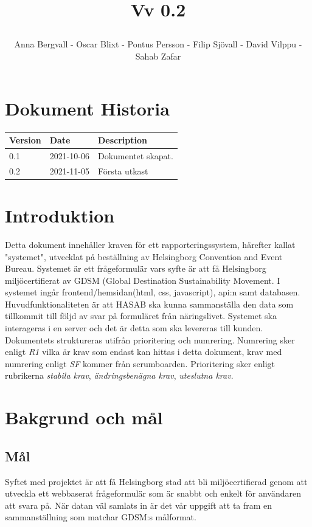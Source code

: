 \documentclass{article}
\date {#1}
\title {
    \documentNumber {01}    

    \documentTitle {Helsingborg Event and Convention Bureau}
    
    \documentDate {2021-08-20}
    \documentVersion Vv 0.2
    
    \author{Anna Bergvall - Oscar Blixt - Pontus Persson - Filip Sjövall - David Vilppu - Sahab Zafar}
}
\begin{document}
\maketitle

\thispagestyle{empty}



\newpage

\tableofcontents


\newpage

\section{Dokument Historia}
\begin{tabular}{ l | l | l }
    Version & Date & Description \\
    \hline
    0.1 & 2021-10-06 & Dokumentet skapat. \\
    0.2 & 2021-11-05 & Första utkast\\
    
\end{tabular}

\section{Introduktion}
    Detta dokument innehåller kraven för ett rapporteringssystem, härefter kallat "systemet", utvecklat på beställning av Helsingborg Convention and Event Bureau. Systemet är ett frågeformulär vars syfte är att få Helsingborg miljöcertifierat av GDSM (Global Destination Sustainability Movement. I systemet ingår frontend/hemsidan(html, css, javascript), api:n samt databasen.  Huvudfunktionaliteten är att HASAB ska kunna sammanställa den data som tillkommit till följd av svar på formuläret från näringslivet. Systemet ska interageras i en server och det är detta som ska levereras till kunden. 
    Dokumentets struktureras utifrån prioritering och numrering. Numrering sker enligt \textit{R1} vilka är krav som endast kan hittas i detta dokument, krav med numrering enligt \textit{SF} kommer från scrumboarden. Prioritering sker enligt rubrikerna \textit{stabila krav}, \textit{ändringsbenägna krav}, \textit{uteslutna krav}. 
    

\section{Bakgrund och mål}

    \subsection{Mål}
      Syftet med projektet är att få Helsingborg stad att bli miljöcertifierad genom att utveckla ett webbaserat frågeformulär som är snabbt och enkelt för användaren att svara på. När datan väl samlats in är det vår uppgift att ta fram en sammanställning som matchar GDSM:s målformat.
        
\end{document}
